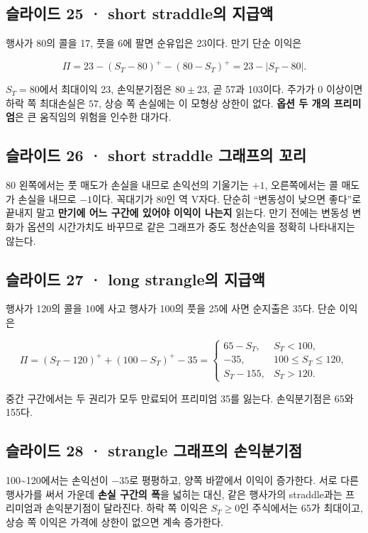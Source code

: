 \documentclass[11pt,a4paper]{article}
\begin{document}
\subsection{슬라이드 25 · short straddle의 지급액}
행사가 80의 콜을 17, 풋을 6에 팔면 순유입은 23이다. 만기 단순 이익은\par

\[
\Pi=23-(S_T-80)^+-(80-S_T)^+=23-|S_T-80|.
\]

$S_T=80$에서 최대이익 23, 손익분기점은 $80\pm23$, 곧 57과 103이다. 주가가 0 이상이면 하락 쪽 최대손실은 $57$, 상승 쪽 손실에는 이 모형상 상한이 없다. \textbf{옵션 두 개의 프리미엄}은 큰 움직임의 위험을 인수한 대가다.\par

\subsection{슬라이드 26 · short straddle 그래프의 꼬리}
80 왼쪽에서는 풋 매도가 손실을 내므로 손익선의 기울기는 $+1$, 오른쪽에서는 콜 매도가 손실을 내므로 $-1$이다. 꼭대기가 80인 역 V자다. 단순히 “변동성이 낮으면 좋다”로 끝내지 말고 \textbf{만기에 어느 구간에 있어야 이익이 나는지} 읽는다. 만기 전에는 변동성 변화가 옵션의 시간가치도 바꾸므로 같은 그래프가 중도 청산손익을 정확히 나타내지는 않는다.\par

\subsection{슬라이드 27 · long strangle의 지급액}
행사가 120의 콜을 10에 사고 행사가 100의 풋을 25에 사면 순지출은 35다. 단순 이익은\par

\[
\Pi=(S_T-120)^++(100-S_T)^+-35
=\begin{cases}65-S_T,&S_T<100,\\-35,&100\leq S_T\leq120,\\S_T-155,&S_T>120.\end{cases}
\]

중간 구간에서는 두 권리가 모두 만료되어 프리미엄 35를 잃는다. 손익분기점은 65와 155다.\par

\subsection{슬라이드 28 · strangle 그래프의 손익분기점}
100\~{}120에서는 손익선이 $-35$로 평평하고, 양쪽 바깥에서 이익이 증가한다. 서로 다른 행사가를 써서 가운데 \textbf{손실 구간의 폭}을 넓히는 대신, 같은 행사가의 straddle과는 프리미엄과 손익분기점이 달라진다. 하락 쪽 이익은 $S_T\geq0$인 주식에서는 65가 최대이고, 상승 쪽 이익은 가격에 상한이 없으면 계속 증가한다.\par
\end{document}
